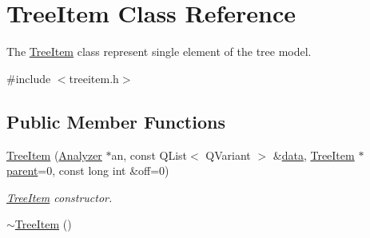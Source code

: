 \hypertarget{class_tree_item}{\section{Tree\-Item Class Reference}
\label{class_tree_item}
}


The \hyperlink{class_tree_item}{Tree\-Item} class represent single element of the tree model.  




{\ttfamily \#include $<$treeitem.\-h$>$}

\subsection*{Public Member Functions}
\begin{DoxyCompactItemize}
\item 
\hyperlink{class_tree_item_ad70866c7a97127bee8a5b11c9f87e2ca}{Tree\-Item} (\hyperlink{class_analyzer}{Analyzer} $\ast$an, const Q\-List$<$ Q\-Variant $>$ \&\hyperlink{class_tree_item_a16641e42c78f004d47a66f3b2c39341f}{data}, \hyperlink{class_tree_item}{Tree\-Item} $\ast$\hyperlink{class_tree_item_a392ec493dfab91ee474d7ff83e2c0211}{parent}=0, const long int \&off=0)
\begin{DoxyCompactList}\small\item\em \hyperlink{class_tree_item}{Tree\-Item} constructor. \end{DoxyCompactList}\item 
\hypertarget{class_tree_item_a859429185d908c3e54861bbbfb185425}{\hyperlink{class_tree_item_a859429185d908c3e54861bbbfb185425}{$\sim$\-Tree\-Item} ()}\label{class_tree_item_a859429185d908c3e54861bbbfb185425}


\end{DoxyCompactItemize}
